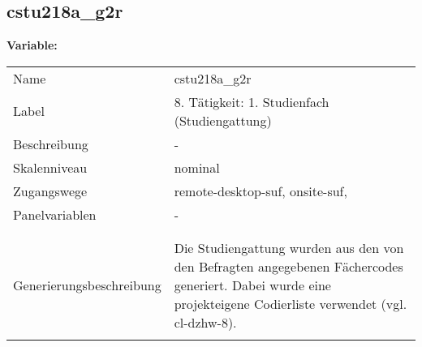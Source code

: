 	
	
	\subsection{cstu218a\_g2r}
	\label{subSection:cstu218a_g2r}

	\noindent\textbf{Variable:}\\
		\begin{tabular}{lL{11.3cm}}
			\label{tableVariable:cstu218a_g2r}
			Name & cstu218a\_g2r \\
			Label & 8. Tätigkeit: 1. Studienfach (Studiengattung) \\
			Beschreibung & - \\
			Skalenniveau & nominal \\
			Zugangswege &
				remote-desktop-suf,
				onsite-suf,
 \\
			Panelvariablen & -
			 \\
			 \\
 \\
					Generierungsbeschreibung & Die Studiengattung wurden aus den von den Befragten angegebenen Fächercodes generiert.  Dabei wurde eine projekteigene Codierliste verwendet (vgl. cl-dzhw-8).
				 \\	
			 \\
		\end{tabular}






